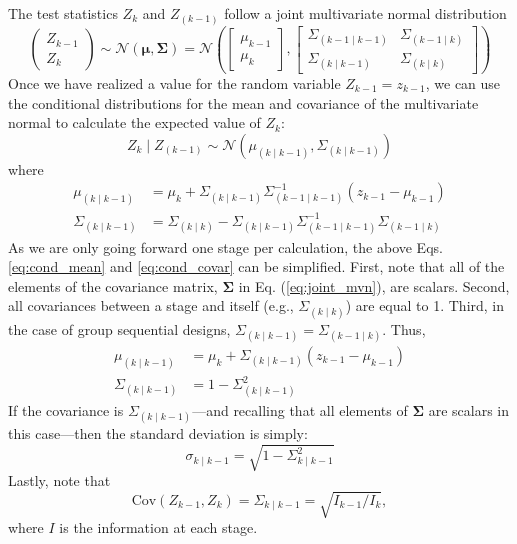 \documentclass{article}
\begin{document}
The test statistics $Z_k$ and $Z_{(k-1)}$ follow a joint multivariate normal distribution
%
\begin{equation} \label{eq:joint_mvn}
    \begin{pmatrix}
        Z_{k-1} \\
        Z_k
    \end{pmatrix} \sim \mathcal{N}(\mathbf{\mu}, \mathbf{\Sigma}) = \mathcal{N}\left( \begin{bmatrix}
        \mu_{k-1}\\
        \mu_k
    \end{bmatrix}, \begin{bmatrix}
        \Sigma_{(k-1\mid k-1)} & \Sigma_{(k-1\mid k)} \\
        \Sigma_{(k\mid k-1)} & \Sigma_{(k\mid k)}
    \end{bmatrix} \right)
\end{equation}
%
Once we have realized a value for the random variable $Z_{k-1}=z_{k-1}$, we can use the conditional distributions for the mean and covariance of the multivariate normal to calculate the expected value of $Z_k$:
%
\begin{equation} \label{eq:cond_dist_zk}
    Z_{k}\mid Z_{(k-1)} \sim \mathcal{N}(\mu_{(k \mid k-1)},\Sigma_{(k\mid k-1)})
\end{equation}
%
where
\begin{align}
    \mu_{(k \mid k-1)} &= \mu_k + \Sigma_{(k \mid k-1)}\Sigma_{(k-1\mid k-1)}^{-1}(z_{k-1} - \mu_{k-1}) \label{eq:cond_mean} \\
    \Sigma_{(k\mid k-1)} &= \Sigma_{(k\mid k)} - \Sigma_{(k \mid k-1)}\Sigma_{(k-1\mid k-1)}^{-1}\Sigma_{(k-1\mid  k)} \label{eq:cond_covar}
\end{align}
%
As we are only going forward one stage per calculation, the above Eqs. \eqref{eq:cond_mean} and \eqref{eq:cond_covar} can be simplified. First, note that all of the elements of the covariance matrix, $\mathbf{\Sigma}$ in Eq. (\ref{eq:joint_mvn}), are scalars. Second, all covariances between a stage and itself (e.g., $\Sigma_{(k\mid k)}$) are equal to 1. Third, in the case of group sequential designs, $\Sigma_{(k \mid k-1)}=\Sigma_{(k-1\mid  k)}$. Thus,
%
\begin{align}
    \mu_{(k \mid k-1)} &= \mu_k + \Sigma_{(k \mid k-1)}(z_{k-1} - \mu_{k-1}) \label{eq:cond_mean_for_calc} \\
    \Sigma_{(k\mid k-1)} &= 1 - \Sigma_{(k \mid k-1)}^2 
\end{align}
%
If the covariance is $\Sigma_{(k\mid k-1)}$---and recalling that all elements of $\mathbf{\Sigma}$ are scalars in this case---then the standard deviation is simply:
%
\begin{equation}
    \sigma_{k\mid k-1}=\sqrt{1- \Sigma_{k\mid k-1}^2} \label{eq:cond_std_for_calc}
\end{equation}
%
Lastly, note that 
\begin{equation} \label{eq:cov_information}
    \mathrm{Cov}(Z_{k-1}, Z_k) = \Sigma_{k\mid k-1} = \sqrt{I_{k-1}/I_k},
\end{equation}
%
where $I$ is the information at each stage.
%
\end{document}

